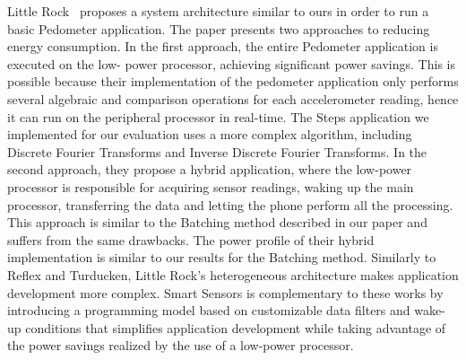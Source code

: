Little Rock~\cite{littlerock} proposes a system 
architecture similar to ours in order to run a basic 
Pedometer application. The paper presents two approaches 
to reducing energy consumption. In the first approach, 
the entire Pedometer application is executed on the low-
power processor, achieving significant power savings. 
This is possible because their implementation of the 
pedometer application only performs several algebraic 
and comparison operations for each accelerometer 
reading, hence it can run on the peripheral processor in 
real-time. The Steps application we implemented for our 
evaluation uses a more complex algorithm, including 
Discrete Fourier Transforms and Inverse Discrete Fourier 
Transforms. In the second approach, they propose a 
hybrid application, where the low-power processor is 
responsible for acquiring sensor readings, waking up the 
main processor, transferring the data and letting the 
phone perform all the processing. This approach is 
similar to the Batching method described in our paper 
and suffers from the same drawbacks. The power profile 
of their hybrid implementation is similar to our results 
for the Batching method. Similarly to Reflex and 
Turducken, Little Rock's heterogeneous architecture 
makes application development more complex. Smart 
Sensors is complementary to these works by introducing a 
programming model based on customizable data filters and 
wake-up conditions that simplifies application 
development while taking advantage of the power savings 
realized by the use of a low-power processor.
\fi
